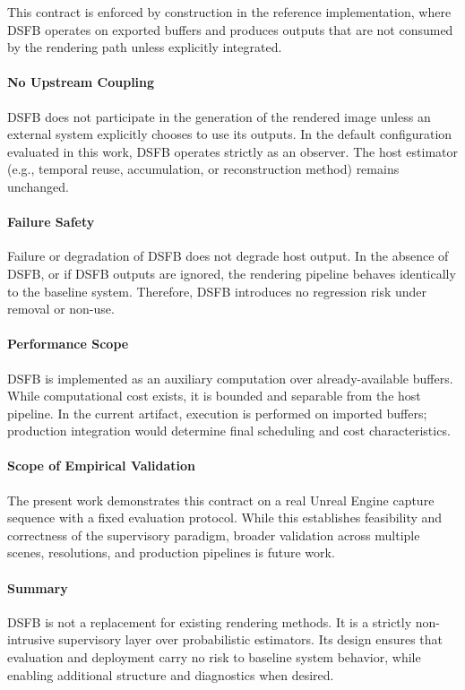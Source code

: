 \documentclass[11pt,letterpaper]{article}
\theoremstyle{gcresult}
\theoremstyle{definition}
\begin{document}
This contract is enforced by construction in the reference implementation, where DSFB operates on exported buffers and produces outputs that are not consumed by the rendering path unless explicitly integrated.


\paragraph{No Upstream Coupling}
DSFB does not participate in the generation of the rendered image unless an external system explicitly chooses to use its outputs. In the default configuration evaluated in this work, DSFB operates strictly as an observer. The host estimator (e.g., temporal reuse, accumulation, or reconstruction method) remains unchanged.

\paragraph{Failure Safety}
Failure or degradation of DSFB does not degrade host output. In the absence of DSFB, or if DSFB outputs are ignored, the rendering pipeline behaves identically to the baseline system. Therefore, DSFB introduces no regression risk under removal or non-use.

\paragraph{Performance Scope}
DSFB is implemented as an auxiliary computation over already-available buffers. While computational cost exists, it is bounded and separable from the host pipeline. In the current artifact, execution is performed on imported buffers; production integration would determine final scheduling and cost characteristics.

\paragraph{Scope of Empirical Validation}
The present work demonstrates this contract on a real Unreal Engine capture sequence with a fixed evaluation protocol. While this establishes feasibility and correctness of the supervisory paradigm, broader validation across multiple scenes, resolutions, and production pipelines is future work.

\paragraph{Summary}
DSFB is not a replacement for existing rendering methods. It is a strictly non-intrusive supervisory layer over probabilistic estimators. Its design ensures that evaluation and deployment carry no risk to baseline system behavior, while enabling additional structure and diagnostics when desired.
\end{document}
